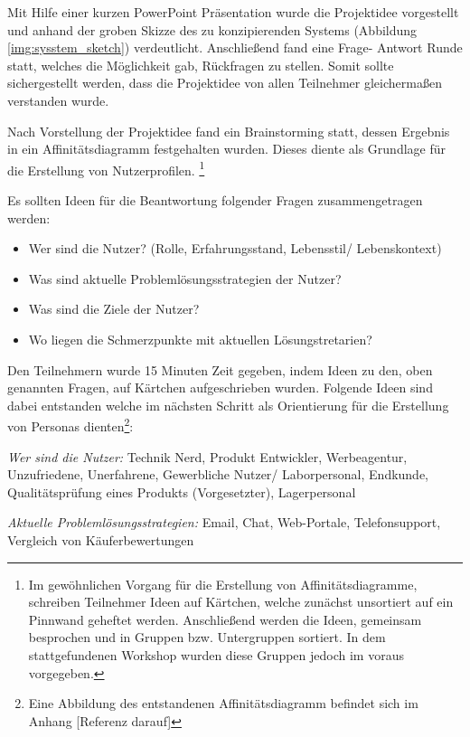 Mit Hilfe einer kurzen PowerPoint Präsentation wurde die Projektidee vorgestellt und anhand der groben Skizze des zu konzipierenden Systems (Abbildung \ref{img:sysstem_sketch}) verdeutlicht. 
Anschließend fand eine Frage- Antwort Runde statt, welches die Möglichkeit gab, Rückfragen zu stellen. Somit sollte sichergestellt werden, dass die Projektidee von allen Teilnehmer gleichermaßen 
verstanden wurde. 

Nach Vorstellung der Projektidee fand ein Brainstorming statt, dessen Ergebnis in ein Affinitätsdiagramm festgehalten wurden. Dieses diente als Grundlage für die Erstellung von Nutzerprofilen. 
\footnote{Im gewöhnlichen Vorgang für die Erstellung von Affinitätsdiagramme, schreiben Teilnehmer Ideen auf Kärtchen, welche zunächst unsortiert auf ein Pinnwand geheftet werden. 
Anschließend werden die Ideen, gemeinsam besprochen und in Gruppen bzw. Untergruppen sortiert. In dem stattgefundenen Workshop wurden diese Gruppen jedoch im voraus vorgegeben.}

Es sollten Ideen für die Beantwortung folgender Fragen zusammengetragen werden: 

\begin{itemize}
	\item Wer sind die Nutzer? (Rolle, Erfahrungsstand,  Lebensstil/ Lebenskontext)
	\item Was sind aktuelle Problemlösungsstrategien der Nutzer?
	\item Was sind die Ziele der Nutzer?
	\item Wo liegen die Schmerzpunkte mit aktuellen Lösungstretarien?
\end{itemize}\label{list:AffiDiagramm}

Den Teilnehmern wurde 15 Minuten Zeit gegeben, indem Ideen zu den, oben genannten Fragen, auf Kärtchen aufgeschrieben wurden.
Folgende Ideen sind dabei entstanden welche im nächsten Schritt als Orientierung für die Erstellung von Personas dienten\footnote{Eine Abbildung des entstandenen Affinitätsdiagramm befindet sich im Anhang [Referenz darauf]}: 

\vspace{2mm}
\textit{Wer sind die Nutzer:} 
Technik Nerd, Produkt Entwickler, Werbeagentur, Unzufriedene, Unerfahrene, Gewerbliche Nutzer/ Laborpersonal, Endkunde, Qualitätsprüfung eines Produkts (Vorgesetzter), Lagerpersonal

\vspace{2mm}
\textit{Aktuelle Problemlösungsstrategien:} 
Email, Chat, Web-Portale, Telefonsupport, Vergleich von Käuferbewertungen


